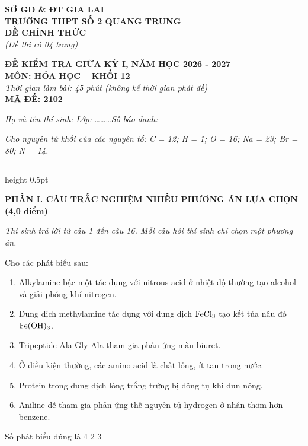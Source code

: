 \documentclass[11pt,a4paper]{article}
\begin{document}
\noindent
\begin{minipage}[t]{0.48\textwidth}
\textbf{SỞ GD \& ĐT GIA LAI}\\
\textbf{TRƯỜNG THPT SỐ 2 QUANG TRUNG}\\
\textbf{ĐỀ CHÍNH THỨC}\\
\textit{(Đề thi có 04 trang)}
\end{minipage}
\hfill
\begin{minipage}[t]{0.48\textwidth}
\raggedleft
\textbf{\color{hfRed}ĐỀ KIỂM TRA GIỮA KỲ I, NĂM HỌC 2026 - 2027}\\
\textbf{MÔN: HÓA HỌC -- KHỐI 12}\\
\textit{Thời gian làm bài: 45 phút (không kể thời gian phát đề)}\\
\textbf{MÃ ĐỀ: 2102}
\end{minipage}

\vspace{4pt}
\noindent
\textit{Họ và tên thí sinh:} \dotfill \textit{Lớp:} \dots\dots\dots \textit{Số báo danh:} \dotfill

\vspace{3pt}
\noindent
\textit{\footnotesize Cho nguyên tử khối của các nguyên tố: C = 12; H = 1; O = 16; Na = 23; Br = 80; N = 14.}

\vspace{2pt}
\hrule height 0.5pt


\vspace{6pt}
\noindent
{\color{mainGreen}\textbf{\large PHẦN I. CÂU TRẮC NGHIỆM NHIỀU PHƯƠNG ÁN LỰA CHỌN (4,0 điểm)}}

\textit{Thí sinh trả lời từ câu 1 đến câu 16. Mỗi câu hỏi thí sinh chỉ chọn một phương án.}

\vspace{2pt}


\begin{ex}
Cho các phát biểu sau:
\begin{enumerate}[label=(\arabic*),itemsep=1pt,leftmargin=1.8cm]
\item Alkylamine bậc một tác dụng với nitrous acid ở nhiệt độ thường tạo alcohol và giải phóng khí nitrogen.
\item Dung dịch methylamine tác dụng với dung dịch $\ce{FeCl3}$ tạo kết tủa nâu đỏ $\ce{Fe(OH)3}$.
\item Tripeptide Ala-Gly-Ala tham gia phản ứng màu biuret.
\item Ở điều kiện thường, các amino acid là chất lỏng, ít tan trong nước.
\item Protein trong dung dịch lòng trắng trứng bị đông tụ khi đun nóng.
\item Aniline dễ tham gia phản ứng thế nguyên tử hydrogen ở nhân thơm hơn benzene.
\end{enumerate}
Số phát biểu đúng là
\choice
{}
{4}
{2}
{3}

\end{ex}
\end{document}

